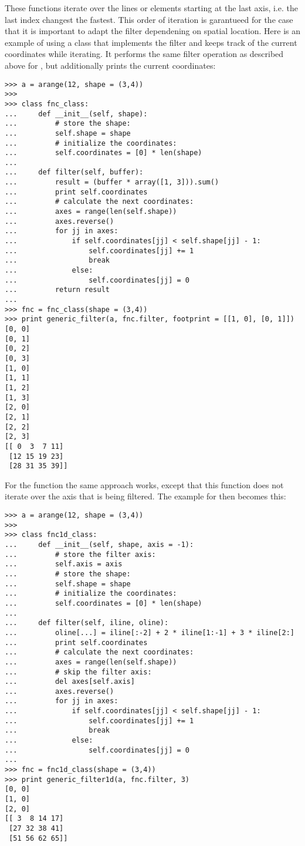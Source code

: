 These functions iterate over the lines or elements starting at the 
last axis, i.e. the last index changest the fastest. This order of iteration 
is garantueed for the case that it is important to adapt the filter 
dependening on spatial location. Here is an example of using a class that 
implements the filter and keeps track of the current coordinates while 
iterating. It performs the same filter operation as described above for 
, but additionally prints the current coordinates:
\begin{verbatim}
>>> a = arange(12, shape = (3,4))
>>> 
>>> class fnc_class:
...     def __init__(self, shape):
...         # store the shape:
...         self.shape = shape
...         # initialize the coordinates:
...         self.coordinates = [0] * len(shape)
...         
...     def filter(self, buffer):
...         result = (buffer * array([1, 3])).sum()
...         print self.coordinates
...         # calculate the next coordinates:
...         axes = range(len(self.shape))
...         axes.reverse()
...         for jj in axes:
...             if self.coordinates[jj] < self.shape[jj] - 1:
...                 self.coordinates[jj] += 1
...                 break
...             else:
...                 self.coordinates[jj] = 0
...         return result
... 
>>> fnc = fnc_class(shape = (3,4))
>>> print generic_filter(a, fnc.filter, footprint = [[1, 0], [0, 1]]) 
[0, 0]
[0, 1]
[0, 2]
[0, 3]
[1, 0]
[1, 1]
[1, 2]
[1, 3]
[2, 0]
[2, 1]
[2, 2]
[2, 3]
[[ 0  3  7 11]
 [12 15 19 23]
 [28 31 35 39]]
\end{verbatim}

For the  function the same approach works, except that this function does not iterate over the axis that is being filtered. The example for  then becomes this:
\begin{verbatim}
>>> a = arange(12, shape = (3,4))
>>> 
>>> class fnc1d_class:
...     def __init__(self, shape, axis = -1):
...         # store the filter axis:
...         self.axis = axis
...         # store the shape:
...         self.shape = shape
...         # initialize the coordinates:
...         self.coordinates = [0] * len(shape)
...         
...     def filter(self, iline, oline):
...         oline[...] = iline[:-2] + 2 * iline[1:-1] + 3 * iline[2:]
...         print self.coordinates
...         # calculate the next coordinates:
...         axes = range(len(self.shape))
...         # skip the filter axis:
...         del axes[self.axis]
...         axes.reverse()
...         for jj in axes:
...             if self.coordinates[jj] < self.shape[jj] - 1:
...                 self.coordinates[jj] += 1
...                 break
...             else:
...                 self.coordinates[jj] = 0
... 
>>> fnc = fnc1d_class(shape = (3,4))
>>> print generic_filter1d(a, fnc.filter, 3)
[0, 0]
[1, 0]
[2, 0]
[[ 3  8 14 17]
 [27 32 38 41]
 [51 56 62 65]]
\end{verbatim}

